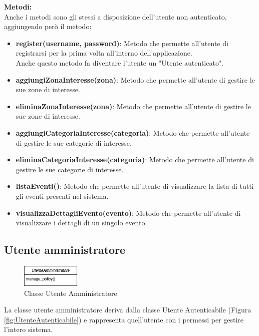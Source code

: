 \documentclass{article}
\begin{document}
\textbf{Metodi:}\\
Anche i metodi sono gli stessi a disposizione dell'utente non autenticato, aggiungendo però il metodo:
\begin{itemize}
	\item \textbf{register(username, password)}: Metodo che permette all'utente di registrarsi per la prima volta all'interno dell'applicazione.\\ Anche questo metodo fa diventare l'utente un "Utente autenticato".
	\item \textbf{aggiungiZonaInteresse(zona)}: Metodo che permette all'utente di gestire le sue zone di interesse.
	\item \textbf{eliminaZonaInteresse(zona)}: Metodo che permette all'utente di gestire le sue zone di interesse.
	\item \textbf{aggiungiCategoriaInteresse(categoria)}: Metodo che permette all'utente di gestire le sue categorie di interesse.
	\item \textbf{eliminaCategoriaInteresse(categoria)}: Metodo che permette all'utente di gestire le sue categorie di interesse.
	\item \textbf{listaEventi()}: Metodo che permette all'utente di visualizzare la lista di tutti gli eventi presenti nel sistema.
	\item \textbf{visualizzaDettagliEvento(evento)}: Metodo che permette all'utente di visualizzare i dettagli di un singolo evento.
\end{itemize}

\clearpage

\subsection{Utente amministratore}

\begin{figure}[htbp]
	\centering
	\includegraphics[width=0.25\textwidth]{Images/UtenteAmministratore-Class.png}
	\caption{Classe Utente Amministratore}
	\label{fig:utente_amministratore}
\end{figure}

La classe utente amministratore deriva dalla classe Utente Autenticabile (Figura \ref{fig:UtenteAutenticabile}) e rappresenta quell'utente con i permessi per gestire l'intero sistema.\\
\end{document}

